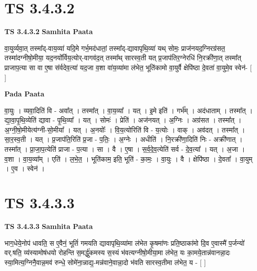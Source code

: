 \documentclass[17pt]{extarticle}
\begin{document}
\section*{ TS 3.4.3.2 }

\textbf{TS 3.4.3.2 } \newline
\textbf{Samhita Paata} \newline

वा॒युर्व्यवा॒त् तस्मा᳚द्-वाय॒व्या॑ यदि॒मे गर्भ॒मद॑धातां॒ तस्मा᳚द्-द्यावापृथि॒व्या॑ यथ् सोमः॒ प्राज॑नयद॒ग्निरग्र॑सत॒ तस्मा॑दग्नीषो॒मीया॒ यद॒नयो᳚र्विय॒त्योर्-वागव॑द॒त् तस्मा᳚थ् सारस्व॒ती यत् प्र॒जाप॑तिर॒ग्नेरधि॑ नि॒रक्री॑णा॒त् तस्मा᳚त् प्राजाप॒त्या सा वा ए॒षा स॑र्वदेव॒त्या॑ यद॒जा व॒शा वा॑य॒व्या॑मा ल॑भेत॒ भूति॑कामो वा॒युर्वै क्षेपि॑ष्ठा दे॒वता॑ वा॒युमे॒व स्वेन॑- [  ] \newline

\textbf{Pada Paata} \newline

वा॒युः । व्यवा॒दिति॑ वि - अवा᳚त् । तस्मा᳚त् । वा॒य॒व्या᳚ । यत् । इ॒मे इति॑ । गर्भ᳚म् । अद॑धाताम् । तस्मा᳚त् । द्या॒वा॒पृ॒थि॒व्येति॑ द्यावा - पृ॒थि॒व्या᳚ । यत् । सोमः॑ । प्रेति॑ । अज॑नयत् । अ॒ग्निः । अग्र॑सत । तस्मा᳚त् । अ॒ग्नी॒षो॒मीयेत्य॑ग्नी-सो॒मीया᳚ । यत् । अ॒नयोः᳚ । वि॒य॒त्योरिति॑ वि - य॒त्योः । वाक् । अव॑दत् । तस्मा᳚त् । सा॒र॒स्व॒ती । यत् । प्र॒जाप॑ति॒रिति॑ प्र॒जा - प॒तिः॒ । अ॒ग्नेः । अधीति॑ । नि॒रक्री॑णा॒दिति॑ निः - अक्री॑णात् । तस्मा᳚त् । प्रा॒जा॒प॒त्येति॑ प्राजा - प॒त्या । सा । वै । ए॒षा । स॒र्व॒दे॒व॒त्येति॑ सर्व - दे॒व॒त्या᳚ । यत् । अ॒जा । व॒शा । वा॒य॒व्या᳚म् । एति॑ । ल॒भे॒त॒ । भूति॑काम॒ इति॒ भूति॑ - का॒मः॒ । वा॒युः । वै । क्षेपि॑ष्ठा । दे॒वता᳚ । वा॒युम् । ए॒व । स्वेन॑ ।  \newline




\section*{ TS 3.4.3.3 }

\textbf{TS 3.4.3.3 } \newline
\textbf{Samhita Paata} \newline

भाग॒धेये॒नोप॑ धावति॒ स ए॒वैनं॒ भूतिं॑ गमयति द्यावापृथि॒व्या॑मा ल॑भेत कृ॒षमा॑णः प्रति॒ष्ठाका॑मो दि॒व ए॒वास्मै॑ प॒र्जन्यो॑ वर्.षति॒ व्य॑स्यामोष॑धयो रोहन्ति स॒मर्द्धु॑कमस्य स॒स्यं भ॑वत्यग्नीषो॒मीया॒मा ल॑भेत॒ यः का॒मये॒तान्न॑वानन्ना॒दः स्या॒मित्य॒ग्निनै॒वान्न॒मव॑ रुन्धे॒ सोमे॑ना॒न्नाद्य॒-मन्न॑वाने॒वान्ना॒दो भ॑वति सारस्व॒तीमा ल॑भेत॒ य - [  ] \newline
\end{document}
